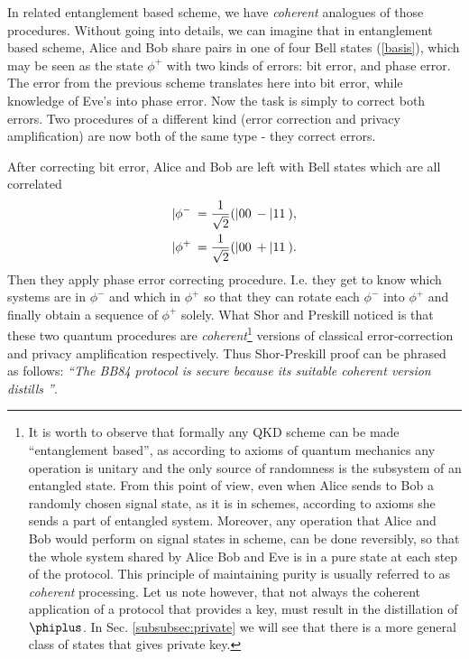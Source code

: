 \documentclass[rmp,12pt,preprint]{revtex4-2}
\begin{document}
In related entanglement based scheme, we have {\it coherent} analogues
of those procedures. Without going into details, we can imagine that
in entanglement based scheme, Alice and Bob share pairs in one of four
Bell states (\ref{basis}), which may be seen as the state $\phi^+$
with two kinds of errors: bit error, and phase error.
The error from the previous scheme translates here into
bit error, while knowledge of Eve's into phase error.
Now the task is simply to correct both errors.
Two procedures of a different kind (error correction
and privacy amplification)
are now both of the same type - they correct errors.

After correcting bit error, Alice and Bob are left with Bell states which are all
correlated
\begin{eqnarray}
|\phi^{-}\> = {1\over {\sqrt 2}}(|00\> - |11\>),\nonumber \\
|\phi^{+}\> = {1\over {\sqrt 2}}(|00\> + |11\>).
\label{eq:correlBell}
\end{eqnarray}
Then they apply phase error correcting procedure. I.e. they get to
know which systems are in $\phi^{-}$ and which in $\phi^{+}$ so
that they can rotate each $\phi^-$ into $\phi^{+}$ and finally
obtain a sequence of $\phi^+$ solely. What Shor and Preskill noticed is
that these two quantum procedures are {\it coherent}\footnote{It is worth to observe that formally any QKD
  scheme can be made ``entanglement based'', as according to axioms of
  quantum mechanics any operation is unitary and the only source of
  randomness is the subsystem of an entangled state.  From this point
  of view, even when Alice sends to Bob a randomly chosen signal
  state, as it is in \pmp schemes, according to axioms she sends a
  part of entangled system. Moreover, any operation that Alice and Bob
  would perform on signal states in \pmp scheme, can be done
  reversibly, so that the whole system shared by Alice Bob and Eve is
  in a pure state at each step of the protocol. This principle of
  maintaining purity is usually referred to as {\it coherent}
  processing. Let us note however, that not always the coherent
  application of a protocol that provides a key, must result in the
  distillation of $\phiplus$. In Sec. \ref{subsubsec:private} we will
  see that there is a more general class of states that gives private
  key.} versions of
classical error-correction and privacy amplification
respectively. Thus Shor-Preskill proof can be phrased as follows: {\it
  ``The BB84 protocol is secure because its suitable coherent version
  distills \eprstates''}.
\end{document}
